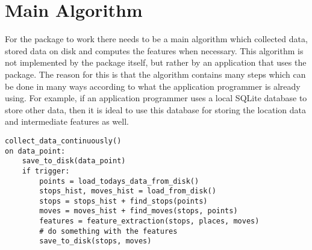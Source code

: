 \section{Main Algorithm}
For the package to work there needs to be a main algorithm which collected data, stored data on disk and computes the features when necessary. This algorithm is not implemented by the package itself, but rather by an application that uses the package. The reason for this is that the algorithm contains many steps which can be done in many ways according to what the application programmer is already using. For example, if an application programmer uses a local SQLite database to store other data, then it is ideal to use this database for storing the location data and intermediate features as well.

\begin{verbatim}
collect_data_continuously()
on data_point:
	save_to_disk(data_point)
	if trigger:
        points = load_todays_data_from_disk()
		stops_hist, moves_hist = load_from_disk()
		stops = stops_hist + find_stops(points)
		moves = moves_hist + find_moves(stops, points)
		features = feature_extraction(stops, places, moves)
		# do something with the features
		save_to_disk(stops, moves)
\end{verbatim}